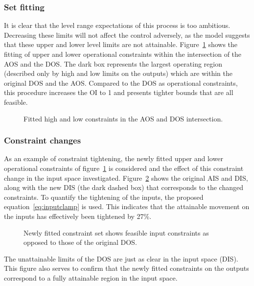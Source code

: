 \subsubsection{Set fitting}
It is clear that the level range expectations of this process is too ambitious.
Decreasing these limits will not affect the control adversely, as the model suggests that these upper and lower level limits are not attainable.
Figure~\ref{fig:flowfitbox} shows the fitting of upper and lower operational constraints within the intersection of the AOS and the DOS.
The dark box represents the largest operating region (described only by high and low limits on the outputs) which are within the original DOS and the AOS.
Compared to the DOS as operational constraints, this procedure increases the OI to 1 and presents tighter bounds that are all feasible.

\begin{figure}[htbp]
  \centering
    \scalebox{1}{}  
  \caption{Fitted high and low constraints in the AOS and DOS intersection.}
  \label{fig:flowfitbox}
\end{figure}

\subsubsection{Constraint changes}
As an example of constraint tightening, the newly fitted upper and lower operational constraints of figure~\ref{fig:flowfitbox} is considered and the effect of this constraint change in the input space investigated.
Figure~\ref{fig:flowconsinput} shows the original AIS and DIS, along with the new DIS (the dark dashed box) that corresponds to the changed constraints.
To quantify the tightening of the inputs, the proposed equation~\ref{eq:inputclamp} is used.
This indicates that the attainable movement on the inputs has effectively been tightened by 27\%. 

\begin{figure}[htbp]
  \centering
    \scalebox{1}{}  
  \caption[AIS, DIS and newly fitted DIS of level and flow rig]{Newly fitted constraint set shows feasible input constraints as opposed to those of the original DOS.}
  \label{fig:flowconsinput}
\end{figure}

The unattainable limits of the DOS are just as clear in the input space (DIS).
This figure also serves to confirm that the newly fitted constraints on the outputs correspond to a fully attainable region in the input space.

